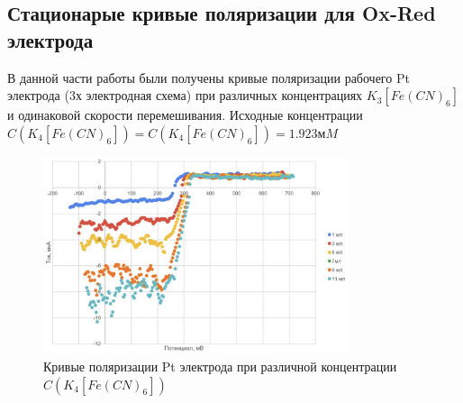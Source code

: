 \documentclass[a4paper,12pt]{article}
\begin{document}
\newpage

\subsection{Стационарые кривые поляризации для Ox-Red электрода}
В данной части работы были получены кривые поляризации рабочего Pt электрода (3х электродная схема) при различных концентрациях  $K_3[Fe(CN)_6]$ и одинаковой скорости перемешивания. Исходные концентрации $C(K_4[Fe(CN)_6]) = C(K_4[Fe(CN)_6]) = 1.923 мM$

\begin{table}[h!]
\caption{Концентрация $K_{3}[Fe(CN)_{6}]$, $K_{4}[Fe(CN)_{6}]$}

\label{tab:my-table}
\end{table}
\begin{figure}[h!]
    \centering
    \includegraphics[width = 0.8\textwidth]{changes in conc.png}
    \caption{Кривые поляризации Pt электрода при различной концентрации $C(K_4[Fe(CN)_6])$}
    \label{fig:no_int}
\end{figure}\\
\end{document}
